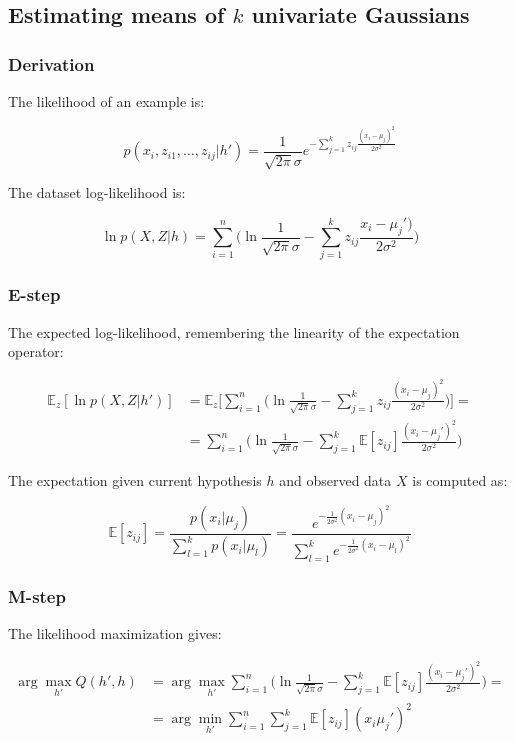 	\subsection{Estimating means of $k$ univariate Gaussians}

		\subsubsection{Derivation}
		The likelihood of an example is:

		$$p(x_i, z_{i1},\dots,z_{ij}|h') = \frac{1}{\sqrt{2\pi}\sigma}e^{-\sum\limits_{j=1}^k z_{ij}\frac{(x_i-\mu_j)^2}{2\sigma^2}}$$

		The dataset log-likelihood is:

		$$\ln p(X,Z|h) = \sum\limits_{i=1}^n\biggl(\ln\frac{1}{\sqrt{2\pi}\sigma}-\sum\limits_{j=1}^kz_{ij}\frac{x_i-\mu_j')}{2\sigma^2}\biggr)$$

		\subsubsection{E-step}
		The expected log-likelihood, remembering the linearity of the expectation operator:

		\begin{align*}
			\mathbb{E}_z[\ln p(X,Z|h')] &=\mathbb{E}_z\biggl[\sum\limits_{i=1}^n\biggl(\ln\frac{1}{\sqrt{2\pi}\sigma}-\sum\limits_{j=1}^kz_{ij}\frac{(x_i-\mu_j)^2}{2\sigma^2}\biggr)\biggr]=\\
						    &=\sum\limits_{i=1}^n\biggl(\ln\frac{1}{\sqrt{2\pi}\sigma}-\sum\limits_{j=1}^k\mathbb{E}[z_{ij}]\frac{(x_i-\mu_j')^2}{2\sigma^2}\biggr)
		\end{align*}

		The expectation given current hypothesis $h$ and observed data $X$ is computed as:

		$$\mathbb{E}[z_{ij}] = \frac{p(x_i|\mu_j)}{\sum\limits_{l=1}^kp(x_i|\mu_l)} = \frac{e^{-\frac{1}{2\sigma^2}(x_i-\mu_j)^2}}{\sum\limits_{l=1}^ke^{-\frac{1}{2\sigma^2}(x_i-\mu_l)^2}}$$

		\subsubsection{M-step}
		The likelihood maximization gives:

		\begin{align*}
			\arg\max\limits_{h'}Q(h',h) &= \arg\max\limits_{h'}\sum\limits_{i=1}^n\biggl(\ln\frac{1}{\sqrt{2\pi}\sigma}-\sum\limits_{j=1}^k\mathbb{E}[z_{ij}]\frac{(x_i-\mu_j')^2}{2\sigma^2}\biggr)=\\
						    &=\arg\min\limits_{h'}\sum\limits_{i=1}^n\sum\limits_{j=1}^k\mathbb{E}[z_{ij}](x_i\mu_j')^2
		\end{align*}

